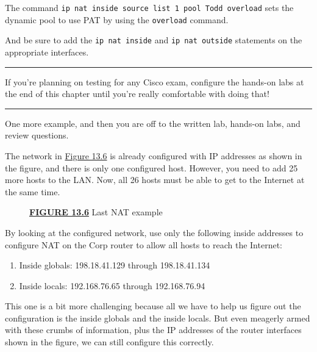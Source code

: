 \documentclass[b5paper,11pt]{memoir}
\begin{document}
The command
\texttt{ip\ nat\ inside\ source\ list\ 1\ pool\ Todd\ overload} sets the
dynamic pool to use PAT by using the \texttt{overload} command.

And be sure to add the \texttt{ip\ nat\ inside} and
\texttt{ip\ nat\ outside} statements on the appropriate interfaces.

\begin{center}\rule{0.5\linewidth}{0.5pt}\end{center}

If you're planning on testing for any
Cisco exam, configure the hands-on labs at the end of this chapter until
you're really comfortable with doing that!

\begin{center}\rule{0.5\linewidth}{0.5pt}\end{center}

One more example, and then you are off to the written lab, hands-on
labs, and review questions.

The network in
\protect\hyperlink{c13.xhtmlux5cux23figure13-6}{Figure 13.6} is already
configured with IP addresses as shown in the figure, and there is only
one configured host. However, you need to add 25 more hosts to the LAN.
Now, all 26 hosts must be able to get to the Internet at the same time.

\begin{figure}
\centering
\caption{{\protect\hyperlink{c13.xhtmlux5cux23figureanchor13-6}{\textbf{FIGURE
13.6}} Last NAT example}}
\end{figure}

By looking at the configured network, use only the following inside
addresses to configure NAT on the Corp router to allow all hosts to
reach the Internet:

\begin{enumerate}
\tightlist
\item
  Inside globals: 198.18.41.129 through 198.18.41.134
\item
  Inside locals: 192.168.76.65 through 192.168.76.94
\end{enumerate}

This one is a bit more challenging because all we have to help us figure
out the configuration is the inside globals and the inside locals. But
even meagerly armed with these crumbs of information, plus the IP
addresses of the router interfaces shown in the figure, we can still
configure this correctly.
\end{document}
